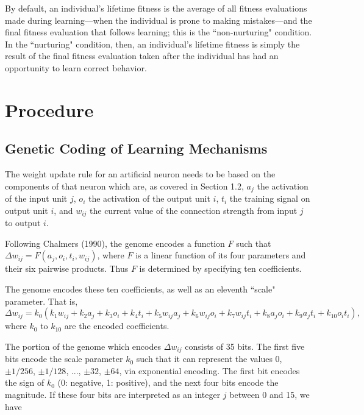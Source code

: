 \documentclass[master]{outhesis}
\begin{document}
By default, an individual's lifetime fitness is the average of all fitness evaluations made during learning---when the individual is prone to making mistakes---and the final fitness evaluation that follows learning; this is the ``non-nurturing" condition.
In the ``nurturing" condition, then, an individual's lifetime fitness is simply the result of the final fitness evaluation taken after the individual has had an opportunity to learn correct behavior.

\chapter{Procedure}

\section{Genetic Coding of Learning Mechanisms}

The weight update rule for an artificial neuron needs to be based on the components of that neuron which are, as covered in Section 1.2, $a_j$ the activation of the input unit $j$, $o_i$ the activation of the output unit $i$, $t_i$ the training signal on output unit $i$, and $w_{ij}$ the current value of the connection strength from input $j$ to output $i$.

Following Chalmers (1990), the genome encodes a function $F$ such that $\Delta w_{ij} = F(a_j, o_i, t_i, w_{ij})$, where $F$ is a linear function of its four parameters and their six pairwise products. Thus $F$ is determined by specifying ten coefficients.

The genome encodes these ten coefficients, as well as an eleventh ``scale" parameter. That is,
\[
	\Delta w_{ij} = k_0(k_1w_{ij}+k_2a_j+k_3o_i+k_4t_i+k_5w_{ij}a_j+k_6w_{ij}o_i+k_7w_{ij}t_{i}+k_8a_jo_i+k_9a_jt_i+k_{10}o_it_i),
\]
where $k_0$ to $k_{10}$ are the encoded coefficients.

The portion of the genome which encodes $\Delta w_{ij}$ consists of 35 bits. The first five bits encode the scale parameter $k_0$ such that it can represent the values $0$, $\pm 1/256$, $\pm 1/128$, ..., $\pm 32$, $\pm 64$, via exponential encoding. The first bit encodes the sign of $k_0$ (0: negative, 1: positive), and the next four bits encode the magnitude. If these four bits are interpreted as an integer $j$ between 0 and 15, we have
\end{document}
